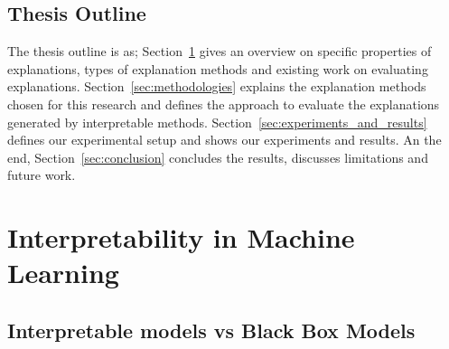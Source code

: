 \documentclass[english]{tktltiki2}
\theoremstyle{definition}
\theoremstyle{remark}
\begin{document}
\subsection{Thesis Outline} %
The thesis outline is as; Section~\ref{sec:interpretability_in_ML} gives an overview on specific properties of explanations, types of explanation methods and existing work on evaluating explanations. Section~\ref{sec:methodologies}  explains the explanation methods chosen for this research and defines the approach to evaluate the explanations generated by interpretable methods. Section~\ref{sec:experiments_and_results} defines our experimental setup and shows our experiments and results. An the end, Section~\ref{sec:conclusion} concludes the results, discusses limitations and future work.


\section{Interpretability in Machine Learning}\label{sec:interpretability_in_ML} %

\subsection{Interpretable models vs Black Box Models} %
\end{document}

